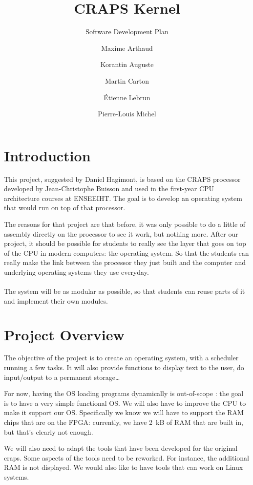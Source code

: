 \documentclass{article}
\title{CRAPS Kernel}
\subtitle{Software Development Plan}
\author{
       Maxime Arthaud
  \and Korantin Auguste
  \and Martin Carton
  \and Étienne Lebrun
  \and Pierre-Louis Michel
}
\begin{document}
  
  \tableofcontents
  \newpage

  \section{Introduction}
    This project, suggested by Daniel Hagimont, is based on the CRAPS processor
    developed by Jean-Christophe Buisson and used in the first-year CPU
    architecture courses at ENSEEIHT. The goal is to develop an operating
    system that would run on top of that processor.

    The reasons for that project are that before, it was only possible to do a
    little of assembly directly on the processor to see it work, but nothing
    more.  After our project, it should be possible for students to really see
    the layer that goes on top of the CPU in modern computers: the operating
    system. So that the students can really make the link between the processor
    they just built and the computer and underlying operating systems they use
    everyday.

    \paragraph{}
    The system will be as modular as possible, so that students can reuse parts
    of it and implement their own modules.

  \section{Project Overview}
    The objective of the project is to create an operating system, with a
    scheduler running a few tasks. It will also provide functions to display
    text to the user, do input/output to a permanent storage\dots

    For now, having the OS loading programs dynamically is out-of-scope : the
    goal is to have a very simple functional OS.  We will also have to improve
    the CPU to make it support our OS. Specifically we know we will have to
    support the RAM chips that are on the FPGA: currently, we have \SI{2}{kB}
    of RAM that are built in, but that's clearly not enough.

    We will also need to adapt the tools that have been developed for the
    original craps. Some aspects of the tools need to be reworked. For
    instance, the additional RAM is not displayed. We would also like to have
    tools that can work on Linux systems.
    
\end{document}
